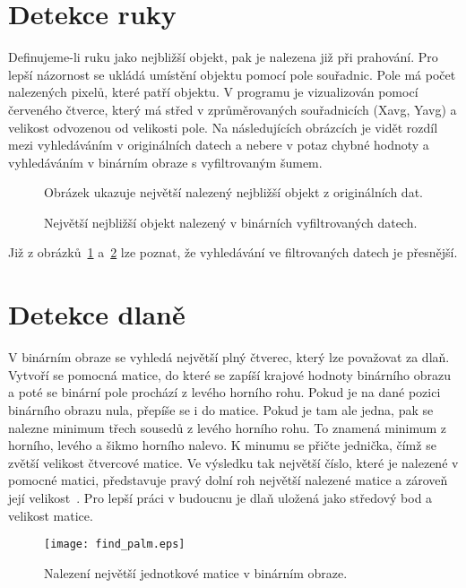 \section{Detekce ruky}
Definujeme-li ruku jako nejbližší objekt, pak je nalezena již při prahování. Pro lepší názornost se ukládá umístění objektu pomocí pole souřadnic. Pole má počet nalezených pixelů, které patří objektu. V programu je vizualizován pomocí červeného čtverce, který má střed v zprůměrovaných souřadnicích (Xavg, Yavg) a velikost odvozenou od velikosti pole. 
Na následujících obrázcích je vidět rozdíl mezi vyhledáváním v originálních datech a nebere v potaz chybné hodnoty a vyhledáváním v binárním obraze s vyfiltrovaným šumem.
\begin{figure}[htp]
\centering
{}
\caption{Obrázek ukazuje největší nalezený nejbližší objekt z originálních dat.}
\label{pic15}
\end{figure}
\begin{figure}[htp]
\centering
{}
\caption{Největší nejbližší objekt nalezený v binárních vyfiltrovaných datech.}
\label{pic16}
\end{figure}

Již z obrázků~\ref{pic15} a~\ref{pic16} lze poznat, že vyhledávání ve filtrovaných datech je přesnější.
\newpage
\section{Detekce dlaně}
V binárním obraze se vyhledá největší plný čtverec, který lze považovat za dlaň. Vytvoří se pomocná matice, do které se zapíší krajové hodnoty binárního obrazu a poté se binární pole prochází z levého horního rohu. Pokud je na dané pozici binárního obrazu nula, přepíše se i do matice. Pokud je tam ale jedna, pak se nalezne minimum třech sousedů z levého horního rohu. To znamená minimum z horního, levého a šikmo horního nalevo. K minumu se přičte jednička, čímž se zvětší velikost čtvercové matice. Ve výsledku tak největší číslo, které je nalezené v pomocné matici, představuje pravý dolní roh největší nalezené matice a zároveň její velikost~\cite{23}. Pro lepší práci v budoucnu je dlaň uložená jako středový bod a velikost matice.

\begin{figure} [htp]
\centering
\texttt{[image: find\_palm.eps]}
\centering
\caption{Nalezení největší jednotkové matice v binárním obraze.}
\label{pic17}
\end{figure}

